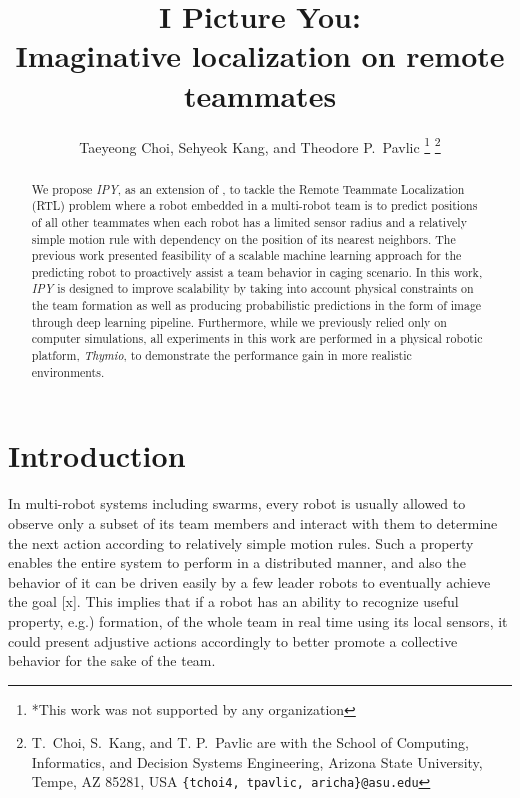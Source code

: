 \documentclass[letterpaper, 10 pt, conference]{ieeeconf}  %
\title{\LARGE \bf
	I Picture You: \\
	Imaginative localization on remote teammates
}
\author{Taeyeong Choi, Sehyeok Kang, and Theodore P.~Pavlic %
	\thanks{*This work was not supported by any organization}%
	\thanks{T.~Choi, S.~Kang, and T. P.~Pavlic are with the School of Computing, Informatics, and Decision Systems Engineering,
		Arizona State University, Tempe, AZ 85281, USA
		{\tt\small \{tchoi4, tpavlic, aricha\}@asu.edu}}%
}
\begin{document}
	
	
	
	\maketitle
	\thispagestyle{empty}
	\pagestyle{empty}
	
	
	\begin{abstract}
		
		We propose \emph{IPY}, as an extension of \cite{Choi17}, to tackle the Remote Teammate 
		Localization (RTL) problem where a robot embedded in a multi-robot team is to predict positions 
		of all other teammates when each robot has a limited sensor radius and a 
		relatively simple motion rule with dependency on the position of its nearest neighbors. 
		The previous work presented feasibility of a scalable machine learning approach for the 
		predicting robot to proactively assist a team behavior in caging scenario. 
		In this work, \emph{IPY} is designed to improve scalability by taking into account
		physical constraints on the team formation as well as producing probabilistic predictions  
		in the form of image through deep learning pipeline.
		Furthermore, while we previously relied only on computer simulations, 
		all experiments in this work are performed in a physical robotic platform, \emph{Thymio}, 
		to demonstrate the performance gain in more realistic environments. 
		
	\end{abstract}
	
	
	
	\section{Introduction}
	\label{sec:intro}
	
	In multi-robot systems including swarms, every robot is usually allowed to observe 
	only a subset of its team members and interact with them to determine the next action 
	according to relatively simple motion rules. 
	Such a property enables the entire system to perform in a distributed manner, and 
	also the behavior of it can be driven easily by a few leader robots to 
	eventually achieve the goal [x]. 
	This implies that if a robot has an ability to recognize useful property, e.g.) formation, 
	of the whole team in real time using its local sensors, 
	it could present adjustive actions accordingly to better promote a collective behavior 
	for the sake of the team.
	
\end{document}
